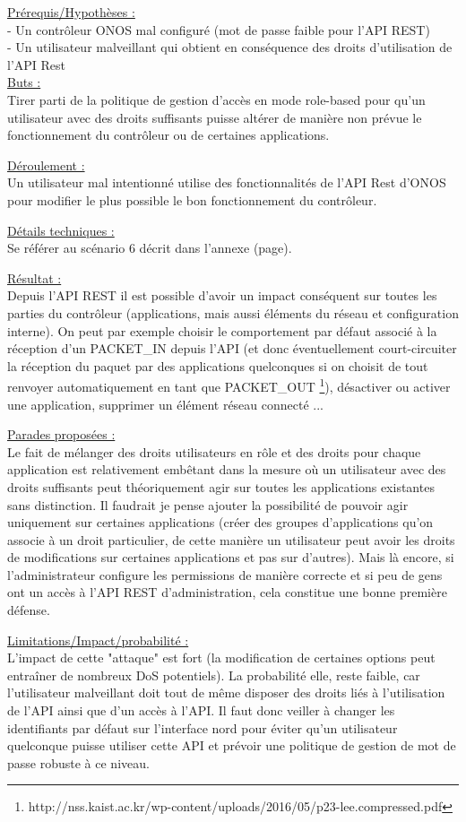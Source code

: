 \underline{Prérequis/Hypothèses :}\\
- Un contrôleur ONOS mal configuré (mot de passe faible pour l'API REST)\\
- Un utilisateur malveillant qui obtient en conséquence des droits d’utilisation de l’API Rest\\


\underline{Buts :}\\
Tirer parti de la politique de gestion d’accès en mode role-based pour qu’un utilisateur avec des droits suffisants puisse altérer de manière non prévue le fonctionnement du contrôleur ou de certaines applications.

\underline{Déroulement :}\\
Un utilisateur mal intentionné utilise des fonctionnalités de l’API Rest d’ONOS pour modifier le plus possible le bon fonctionnement du contrôleur.

\underline{Détails techniques :}\\
Se référer au scénario 6 décrit dans l'annexe (page).

\underline{Résultat :}\\
Depuis l'API REST il est possible d'avoir un impact conséquent sur toutes les parties du contrôleur (applications, mais aussi éléments du réseau et configuration interne). On peut par exemple choisir le comportement par défaut associé à la réception d'un PACKET\_IN depuis l'API (et donc éventuellement court-circuiter la réception du paquet par des applications quelconques si on choisit de tout renvoyer automatiquement en tant que PACKET\_OUT \footnote{\label{ONOS_REST}http://nss.kaist.ac.kr/wp-content/uploads/2016/05/p23-lee.compressed.pdf}), désactiver ou activer une application, supprimer un élément réseau connecté ...

\underline{Parades proposées :}\\
Le fait de mélanger des droits utilisateurs en rôle et des droits pour chaque application est relativement embêtant dans la mesure où un utilisateur avec des droits suffisants peut théoriquement agir sur toutes les applications existantes sans distinction. Il faudrait je pense ajouter la possibilité de pouvoir agir uniquement sur certaines applications (créer des groupes d’applications qu’on associe à un droit particulier, de cette manière un utilisateur peut avoir les droits de modifications sur certaines applications et pas sur d’autres). Mais là encore, si l'administrateur configure les permissions de manière correcte et si peu de gens ont un accès à l'API REST d'administration, cela constitue une bonne première défense.

\underline{Limitations/Impact/probabilité :}\\
L’impact de cette "attaque" est fort (la modification de certaines options peut entraîner de nombreux DoS potentiels). La probabilité elle, reste faible, car l’utilisateur malveillant doit tout de même disposer des droits liés à l’utilisation de l’API ainsi que d’un accès à l’API. Il faut donc veiller à changer les identifiants par défaut sur l’interface nord pour éviter qu’un utilisateur quelconque puisse utiliser cette API et prévoir une politique de gestion de mot de passe robuste à ce niveau.